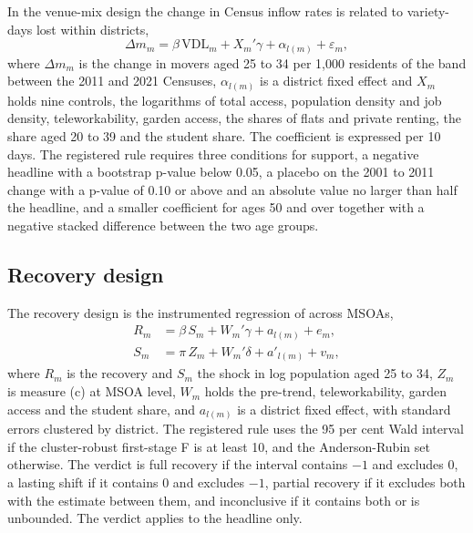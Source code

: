 \documentclass[11pt,a4paper]{article}
\begin{document}
In the venue-mix design the change in Census inflow rates is related to variety-days lost within districts,
\begin{equation}\label{eq:vm}
\Delta m_m = \beta \, \mathrm{VDL}_m + X_m' \gamma + \alpha_{l(m)} + \varepsilon_m,
\end{equation}
where $\Delta m_m$ is the change in movers aged 25 to 34 per 1,000 residents of the band between the 2011 and 2021 Censuses, $\alpha_{l(m)}$ is a district fixed effect and $X_m$ holds nine controls, the logarithms of total access, population density and job density, teleworkability, garden access, the shares of flats and private renting, the share aged 20 to 39 and the student share. The coefficient is expressed per 10 days. The registered rule requires three conditions for support, a negative headline with a bootstrap p-value below 0.05, a placebo on the 2001 to 2011 change with a p-value of 0.10 or above and an absolute value no larger than half the headline, and a smaller coefficient for ages 50 and over together with a negative stacked difference between the two age groups.

\subsection{Recovery design}

The recovery design is the instrumented regression of \citet{davis2002} across MSOAs,
\begin{equation}\label{eq:rec}
\begin{aligned}
R_m &= \beta\, S_m + W_m' \gamma + a_{l(m)} + e_m, \\
S_m &= \pi\, Z_m + W_m' \delta + a'_{l(m)} + v_m,
\end{aligned}
\end{equation}
where $R_m$ is the recovery and $S_m$ the shock in log population aged 25 to 34, $Z_m$ is measure (c) at MSOA level, $W_m$ holds the pre-trend, teleworkability, garden access and the student share, and $a_{l(m)}$ is a district fixed effect, with standard errors clustered by district. The registered rule uses the 95 per cent Wald interval if the cluster-robust first-stage F is at least 10, and the Anderson-Rubin set otherwise. The verdict is full recovery if the interval contains $-1$ and excludes 0, a lasting shift if it contains 0 and excludes $-1$, partial recovery if it excludes both with the estimate between them, and inconclusive if it contains both or is unbounded. The verdict applies to the headline only.
\end{document}
